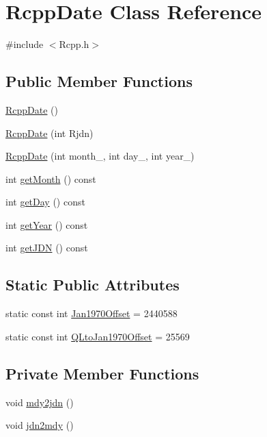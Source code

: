 \hypertarget{classRcppDate}{
\section{RcppDate Class Reference}
\label{classRcppDate}
}


{\ttfamily \#include $<$Rcpp.h$>$}\subsection*{Public Member Functions}
\begin{DoxyCompactItemize}
\item 
\hyperlink{classRcppDate_a4f0f6ae9e9e284fd058d615bcd78d6f9}{RcppDate} ()
\item 
\hyperlink{classRcppDate_a21adf306ddf84cf792f888d220bb9a3f}{RcppDate} (int Rjdn)
\item 
\hyperlink{classRcppDate_a8b96145664d63ec84267870787025fa4}{RcppDate} (int month\_\-, int day\_\-, int year\_\-)
\item 
int \hyperlink{classRcppDate_a16ca2d57a2c4047b027c8b8b0db5184f}{getMonth} () const 
\item 
int \hyperlink{classRcppDate_a20efbcdddceac536425407b3169fff5a}{getDay} () const 
\item 
int \hyperlink{classRcppDate_a79a7696fbce7b448ab545ce35c40811b}{getYear} () const 
\item 
int \hyperlink{classRcppDate_a71332de00640903fe99ce13a37fd9f67}{getJDN} () const 
\end{DoxyCompactItemize}
\subsection*{Static Public Attributes}
\begin{DoxyCompactItemize}
\item 
static const int \hyperlink{classRcppDate_a44b0643ab19489a0fb9700d25f504902}{Jan1970Offset} = 2440588
\item 
static const int \hyperlink{classRcppDate_a06b285d4a04c5225a067e76d4fbfd2d4}{QLtoJan1970Offset} = 25569
\end{DoxyCompactItemize}
\subsection*{Private Member Functions}
\begin{DoxyCompactItemize}
\item 
void \hyperlink{classRcppDate_aaaa626a51e3b2eb4978caf5dcdf9df70}{mdy2jdn} ()
\item 
void \hyperlink{classRcppDate_aca9e6ccbf5bf76e9bba92f2a3083c135}{jdn2mdy} ()
\end{DoxyCompactItemize}
